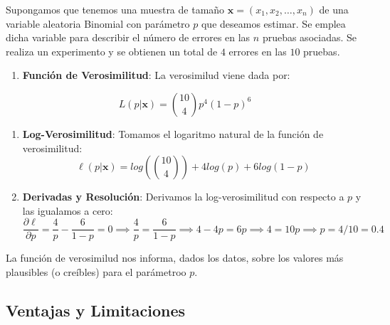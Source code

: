 \documentclass[
  letterpaper,
  DIV=11,
  numbers=noendperiod]{scrreprt}
\providecommand{\tightlist}{%
  \setlength{\itemsep}{0pt}\setlength{\parskip}{0pt}}\usepackage{longtable,booktabs,array}
\begin{document}
\begin{tcolorbox}[enhanced jigsaw, arc=.35mm, breakable, coltitle=black, left=2mm, opacityback=0, bottomtitle=1mm, colbacktitle=quarto-callout-tip-color!10!white, title=\textcolor{quarto-callout-tip-color}{\faLightbulb}\hspace{0.5em}{Ejemplo, distribución Binomial}, titlerule=0mm, colback=white, colframe=quarto-callout-tip-color-frame, bottomrule=.15mm, rightrule=.15mm, opacitybacktitle=0.6, toptitle=1mm, toprule=.15mm, leftrule=.75mm]

Supongamos que tenemos una muestra de tamaño
\(\mathbf{x} = (x_1, x_2, \ldots, x_n)\) de una variable aleatoria
Binomial con parámetro \(p\) que deseamos estimar. Se emplea dicha
variable para describir el número de errores en las \(n\) pruebas
asociadas. Se realiza un experimento y se obtienen un total de \(4\)
errores en las \(10\) pruebas.

\begin{enumerate}
\def\labelenumi{\arabic{enumi}.}
\tightlist
\item
  \textbf{Función de Verosimilitud}: La verosimilud viene dada por:
\end{enumerate}

\[
L(p|\mathbf{x}) = {10 \choose 4}p^4(1-p)^6
\]

\begin{enumerate}
\def\labelenumi{\arabic{enumi}.}
\setcounter{enumi}{1}
\item
  \textbf{Log-Verosimilitud}: Tomamos el logaritmo natural de la función
  de verosimilitud: \[
  \ell(p|\mathbf{x}) = log\left({10 \choose 4}\right) +4log(p)+6log(1-p)
  \]
\item
  \textbf{Derivadas y Resolución}: Derivamos la log-verosimilitud con
  respecto a \(p\) y las igualamos a cero: \[
  \frac{\partial \ell}{\partial p} =\frac{4}{p} -\frac{6}{1-p}= 0 \implies \frac{4}{p}=\frac{6}{1-p}\implies 4-4p=6p\implies 4=10p \implies p=4/10=0.4
  \]
\end{enumerate}

La función de verosimilud nos informa, dados los datos, sobre los
valores más plausibles (o creíbles) para el parámetroo \(p\).

\end{tcolorbox}

\hypertarget{ventajas-y-limitaciones-1}{%
\subsection{Ventajas y Limitaciones}\label{ventajas-y-limitaciones-1}}
\end{document}
